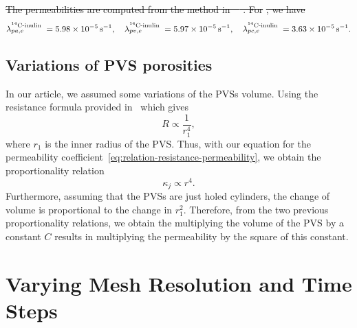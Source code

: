 \documentclass[10pt]{article}
\newcommand{\AP}[1]{\textcolor{blue}{AP: #1}}
\newcommand{\1}{^{(1)}}
\newcommand{\2}{^{(2)}}
\newcommand{\Cinulin}{$\prescript{14}{}{\text{C}}$-inulin }
\providecommand{\DIFaddtex}[1]{{\protect\color{blue}\uwave{#1}}} %
\providecommand{\DIFdeltex}[1]{{\protect\color{red}\sout{#1}}}                      %
\providecommand{\DIFaddbegin}{} %
\providecommand{\DIFaddend}{} %
\providecommand{\DIFdelend}{} %
\providecommand{\DIFadd}[1]{\texorpdfstring{\DIFaddtex{#1}}{#1}} %
\providecommand{\DIFdel}[1]{\texorpdfstring{\DIFdeltex{#1}}{}} %
\newcommand{\DIFaddincludegraphics}[2][]{{\color{blue}\fbox{\DIFOincludegraphics[#1]{#2}}}} %
\DeclareRobustCommand{\DIFaddbegin}{\DIFOaddbegin \let\includegraphics\DIFaddincludegraphics} %
\DeclareRobustCommand{\DIFaddend}{\DIFOaddend \let\includegraphics\DIFOincludegraphics} %
\DeclareRobustCommand{\DIFdelend}{\DIFOaddend \let\includegraphics\DIFOincludegraphics} %
\begin{document}
\DIFdel{The permeabilities are computed from the method in~\mbox{%
\cite{li-2010-BBB}}\hspace{0pt}%
. For }%
\DIFdel{, we have 
}\DIFdelend \DIFaddbegin \DIFadd{Finally, we obtain 
}\DIFaddend \[
        \lambda_{pa,e}^\text{\Cinulin} = 5.98\times 10^{-5}\,\si{\second^{-1}}, \quad \lambda_{pv,e}^\text{\Cinulin} = 5.97 \times 10^{-5}\,\si{\second^{-1}}, \quad \lambda_{pc,e}^\text{\Cinulin} = 3.63 \times 10^{-5}\, \si{\second^{-1}}.  
\]

\subsection{Variations of PVS porosities}

In our article, we assumed some variations of the PVSs volume. Using the resistance formula provided in~\cite{Vinje-2020-ICP} which gives 
\[
R \propto \frac{1}{r_1^4},
\]
where $r_1$ is the inner radius of the PVS.  
Thus, with our equation for the permeability coefficient~\eqref{eq:relation-resistance-permeability}, we obtain the proportionality relation 
\[
\kappa_j \propto r^4.
\]
Furthermore, assuming that the PVSs are just holed cylinders, the change of volume is proportional to the change in $r_1^2$. 
Therefore, from the two previous proportionality relations, we obtain the multiplying the volume of the PVS by a constant $C$ results in multiplying the permeability by the square of this constant.  

\FloatBarrier
\section{Varying Mesh Resolution and Time Steps}
\label{app:model-num}
\end{document}
